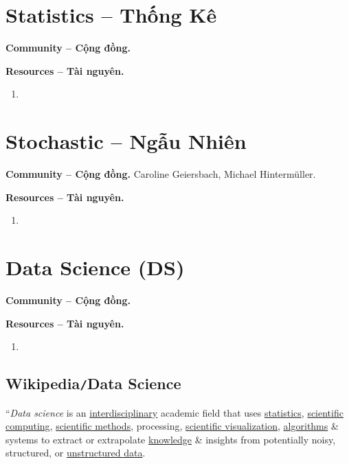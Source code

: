 \documentclass{article}
\begin{document}

\section{Statistics -- Thống Kê}
\textbf{\textsf{Community -- Cộng đồng.}} 

\noindent\textbf{\textsf{Resources -- Tài nguyên.}}
\begin{enumerate}
	\item 
\end{enumerate}


\section{Stochastic -- Ngẫu Nhiên}
\textbf{\textsf{Community -- Cộng đồng.}} {\sc Caroline Geiersbach}, {\sc Michael Hinterm\"uller}.

\noindent\textbf{\textsf{Resources -- Tài nguyên.}}
\begin{enumerate}
	\item 
\end{enumerate}


\section{Data Science (DS)}
\textbf{\textsf{Community -- Cộng đồng.}} 

\noindent\textbf{\textsf{Resources -- Tài nguyên.}}
\begin{enumerate}
	\item 
\end{enumerate}

\subsection{Wikipedia{\tt/}Data Science}
``{\it Data science} is an \href{https://en.wikipedia.org/wiki/Interdisciplinary}{interdisciplinary} academic field that uses \href{https://en.wikipedia.org/wiki/Statistics}{statistics}, \href{https://en.wikipedia.org/wiki/Scientific_computing}{scientific computing}, \href{https://en.wikipedia.org/wiki/Scientific_method}{scientific methods}, processing, \href{https://en.wikipedia.org/wiki/Scientific_visualization}{scientific visualization}, \href{https://en.wikipedia.org/wiki/Algorithm}{algorithms} \& systems to extract or extrapolate \href{https://en.wikipedia.org/wiki/Knowledge}{knowledge} \& insights from potentially noisy, structured, or \href{https://en.wikipedia.org/wiki/Unstructured_data}{unstructured data}.
\end{document}
